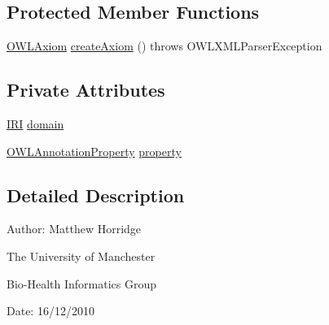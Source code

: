 \subsection*{Protected Member Functions}
\begin{DoxyCompactItemize}
\item 
\hyperlink{interfaceorg_1_1semanticweb_1_1owlapi_1_1model_1_1_o_w_l_axiom}{O\-W\-L\-Axiom} \hyperlink{classorg_1_1coode_1_1owlapi_1_1owlxmlparser_1_1_o_w_l_annotation_property_domain_element_handler_afcef2c68bb9a5cadd8f15510819e6bfe}{create\-Axiom} ()  throws O\-W\-L\-X\-M\-L\-Parser\-Exception 
\end{DoxyCompactItemize}
\subsection*{Private Attributes}
\begin{DoxyCompactItemize}
\item 
\hyperlink{classorg_1_1semanticweb_1_1owlapi_1_1model_1_1_i_r_i}{I\-R\-I} \hyperlink{classorg_1_1coode_1_1owlapi_1_1owlxmlparser_1_1_o_w_l_annotation_property_domain_element_handler_ae94dbcbd9f84197de53f369e4f9858cb}{domain}
\item 
\hyperlink{interfaceorg_1_1semanticweb_1_1owlapi_1_1model_1_1_o_w_l_annotation_property}{O\-W\-L\-Annotation\-Property} \hyperlink{classorg_1_1coode_1_1owlapi_1_1owlxmlparser_1_1_o_w_l_annotation_property_domain_element_handler_a4e098b2e55a727961eef8088c28d87da}{property}
\end{DoxyCompactItemize}


\subsection{Detailed Description}
Author\-: Matthew Horridge\par
 The University of Manchester\par
 Bio-\/\-Health Informatics Group\par
 Date\-: 16/12/2010 

